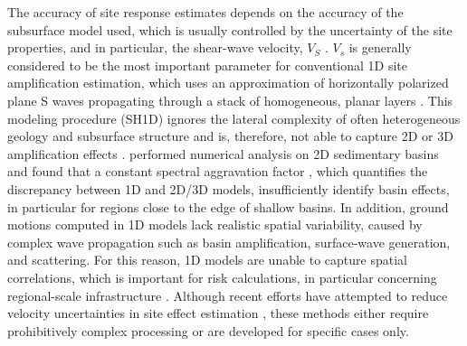 The accuracy of site response estimates depends on the accuracy of the subsurface model used, which is usually controlled by the uncertainty of the site properties, and in particular, the shear-wave velocity, $V_S$ . $V_s$ is generally considered to be the most important parameter for conventional 1D site amplification estimation, which uses an approximation of horizontally polarized plane S waves propagating through a stack of homogeneous, planar layers . This modeling procedure (SH1D) ignores the lateral complexity of often heterogeneous geology and subsurface structure and is, therefore, not able to capture 2D or 3D amplification effects . \citet{zhuSeismicAggravationShallow2018} performed numerical analysis on 2D sedimentary basins and found that a constant spectral aggravation factor \citep{chavez-garciaComplexSiteEffects2000}, which quantifies the discrepancy between 1D and 2D/3D models, insufficiently identify basin effects, in particular for regions close to the edge of shallow basins. In addition, ground motions computed in 1D models lack realistic spatial variability, caused by complex wave propagation such as basin amplification, surface-wave generation, and scattering. For this reason, 1D models are unable to capture spatial correlations, which is important for risk calculations, in particular concerning regional-scale infrastructure . Although recent efforts have attempted to reduce velocity uncertainties in site effect estimation \citep{matavosicPracticesProceduresSitespecific2012,teagueMeasuredVsPredicted2018}, these methods either require prohibitively complex processing or are developed for specific cases only.


